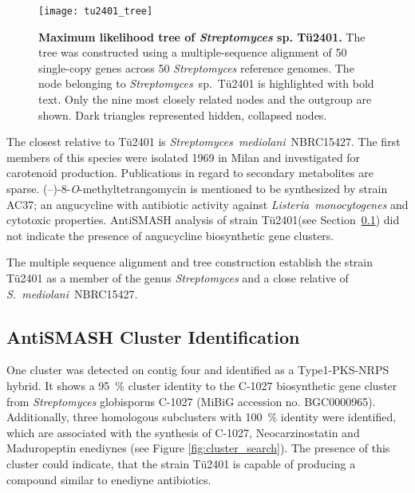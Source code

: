 \begin{figure}[htbp]
	\texttt{[image: tu2401\_tree]}
	\caption[Maximum likelihood tree of \emph{Streptomyces} sp. Tü2401.]{%
		\textbf{Maximum likelihood tree of \emph{Streptomyces} sp. Tü2401.}
		The tree was constructed using a multiple-sequence alignment of 50 single-copy genes across 50 \textit{Streptomyces} reference genomes.
		The node belonging to \textit{Streptomyces}~sp.~Tü2401 is highlighted with bold text.
		Only the nine most closely related nodes and the outgroup are shown.
		Dark triangles represented hidden, collapsed nodes.}
	\label{fig:phylo_tree}
\end{figure}

The closest relative to Tü2401 is \emph{Streptomyces~mediolani}~NBRC15427.
The first members of this species were isolated 1969 in Milan and investigated for carotenoid production.\autocite{Arcamone1969,Bianchi1970}
Publications in regard to secondary metabolites are sparse.
(--)-8-\emph{O}-methyltetrangomycin is mentioned to be synthesized by strain AC37; an angucycline with antibiotic activity against \emph{Listeria~monocytogenes} and cytotoxic properties.\autocite{Maruna2010,Jimenez2012}
AntiSMASH analysis of strain Tü2401(see Section~\ref{sub:antismash_cluster_identification}) did not indicate the presence of angucycline biosynthetic gene clusters.

The multiple sequence alignment and tree construction establish the strain Tü2401 as a member of the genus \emph{Streptomyces} and a close relative of \emph{S.~mediolani}~NBRC15427.


\subsection{AntiSMASH Cluster Identification} %
\label{sub:antismash_cluster_identification}


 One cluster was detected on contig four and identified as a Type1-PKS-NRPS hybrid.
 It shows a 95~\% cluster identity to the C-1027 biosynthetic gene cluster from \textit{Streptomyces} globisporus C-1027 (MiBiG accession no. BGC0000965). Additionally, three homologous subclusters with 100~\% identity were identified, which are associated with the synthesis of C-1027, Neocarzinostatin and Maduropeptin enediynes (see Figure \ref{fig:cluster_search}).
 The presence of this cluster could indicate, that the strain Tü2401 is capable of producing a compound similar to enediyne antibiotics.


